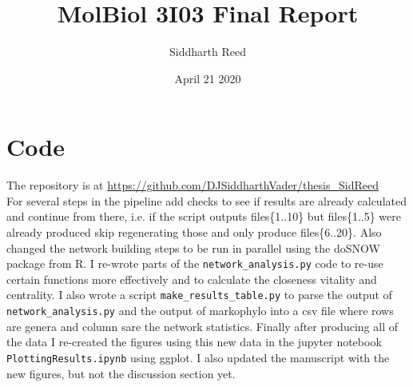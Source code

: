 \documentclass[12pt,letter]{article}
\begin{document}
\title{\vspace{-1in}MolBiol 3I03 Final Report}
\author{Siddharth Reed}
\date{\vspace{-0.2in}April 21 2020}
\maketitle
\vspace{-0.5in}
\section{Code}
The repository is at \url{https://github.com/DJSiddharthVader/thesis_SidReed}\\
For several steps in the pipeline add checks to see if results are already calculated and continue from there, i.e. if the script outputs files\{1..10\} but files\{1..5\} were already produced skip regenerating those and only produce files\{6..20\}.
Also changed the network building steps to be run in parallel using the doSNOW package from R.
I re-wrote parts of the \verb|network_analysis.py| code to re-use certain functions more effectively and to calculate the closeness vitality and centrality.
I also wrote a script \verb|make_results_table.py| to parse the output of \verb|network_analysis.py| and the output of markophylo into a csv file where rows are genera and column sare the network statistics.
Finally after producing all of the data I re-created the figures using this new data in the jupyter notebook \verb|PlottingResults.ipynb| using ggplot.
I also updated the manuscript with the new figures, but not the discussion section yet.
\end{document}
